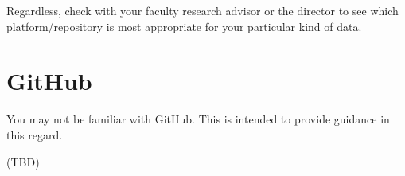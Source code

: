 \documentclass[]{tufte-book}
\begin{document}
Regardless, check with your faculty research advisor or the director to see which platform/repository is most appropriate for your particular kind of data.

\hypertarget{github}{%
\chapter{GitHub}\label{github}}

You may not be familiar with GitHub. This is intended to provide guidance in this regard.

(TBD)




\printindex
\end{document}
